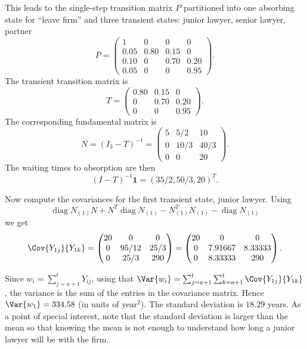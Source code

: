 \documentclass[12pt]{article}
\begin{document}
\begin{solution}
    This leads to the single-step transition matrix \( P \) partitioned
    into one absorbing state for ``leave firm'' and three transient
    states:  junior lawyer, senior lawyer, partner
    \[
        P =
        \begin{pmatrix}
            1 & 0 & 0 & 0 \\
            0.05 & 0.80 & 0.15 & 0 \\
            0.10 & 0 & 0.70 & 0.20 \\
            0.05 & 0 & 0 & 0.95
        \end{pmatrix}
        .
    \] The transient transition matrix is
    \[
        T =
        \begin{pmatrix}
            0.80 & 0.15 & 0 \\
            0 & 0.70 & 0.20 \\
            0 & 0 & 0.95
        \end{pmatrix}
        .
    \] The corresponding fundamental matrix is
    \[
        N= (I_3 - T)^{-1} =
        \begin{pmatrix}
            5 & 5/2 & 10 \\
            0 & 10/3 & 40/3 \\
            0 & 0 & 20
        \end{pmatrix}
        .
    \] The waiting times to absorption are then
    \[
        (I-T)^{-1} \mathbf{1} = (35/2, 50/3, 20)^{T}.
    \]

    Now compute the covariances for the first transient state, junior
    lawyer.  Using
    \[
        \operatorname{diag}
        {N_{(1)}} N + N^T
        \operatorname{diag}
        {N_{(1)}} - N_{(1)}^T N_{(1)} -
        \operatorname{diag}
        N_{(1)}
    \] we get
    \[
        \Cov{Y_{1j}}{Y_{1k}} =
        \begin{pmatrix}
            20 & 0 & 0 \\
            0 & 95/12 & 25/3 \\
            0 & 25/3 & 290
        \end{pmatrix}
        =
        \begin{pmatrix}
            20 & 0 & 0 \\
            0 & 7.91667 & 8.33333 \\
            0 & 8.33333 & 290
        \end{pmatrix}
        .
    \]

    Since \( w_i = \sum_{j=a+1}^{t} Y_{ij} \), using that \( \Var{w_i} =
    \sum_{j=a+1}^t \sum_{k=a+1}^t \Cov{Y_{1j}}{Y_{1k}} \), the variance
    is the sum of the entries in the covariance matrix.  Hence \( \Var{w_1}
    = 334.58 \) (in units of \( \text{year}^2 \)).  The standard
    deviation is \( 18.29 \) years.  As a point of special interest,
    note that the standard deviation is larger than the mean so that
    knowing the mean is not enough to understand how long a junior
    lawyer will be with the firm.
\end{solution}
\end{document}
